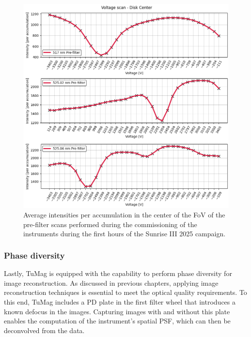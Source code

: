 \begin{figure}[t]
    \begin{minipage}[c]{0.67\textwidth}
      \includegraphics[width=\textwidth]{figures/Pipeline/Prefilter_scans.png}
    \end{minipage}\hfill
    \begin{minipage}[c]{0.29\textwidth}
      \caption[Average intensities measured for each pre-filter.]{
       Average intensities per accumulation in the center of the FoV of the pre-filter scans performed during the commissioning of the instruments during the first hours of the Sunrise III 2025 campaign.  
       \label{fig_pipeline:  prefilter_scans}
      } 
    \end{minipage}
  \end{figure}


\subsubsection{\label{susec: PD_measurements}Phase diversity}

Lastly, TuMag is equipped with the capability to perform phase diversity for image reconstruction. As discussed in previous chapters, applying image reconstruction techniques is essential to meet the optical quality requirements. To this end, TuMag includes a PD plate in the first filter wheel that introduces a known defocus in the images. Capturing images with and without this plate enables the computation of the instrument's spatial PSF, which can then be deconvolved from the data.


